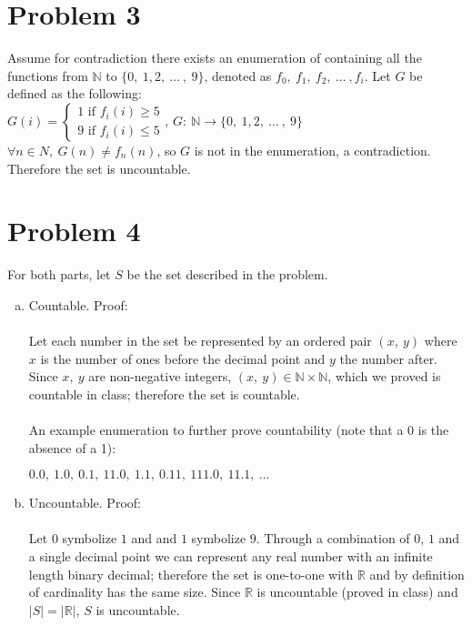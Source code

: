 \documentclass[11pt]{article}
\begin{document}
\section*{Problem 3}
	Assume for contradiction there exists an enumeration of containing all the functions from $\mathbb{N}$ to $\{0,\ 1,2,\ \ldots\ ,\ 9\}$, 
	denoted as $f_0,\ f_1,\ f_2,\ \ldots\ , f_i$. Let $G$ be defined as the following:\\
	
	
	$G(i) = \begin{cases}
		1 \text{ if } f_i(i) \geq 5 \\
		9 \text{ if } f_i(i) \le 5
	\end{cases}$, $G:\ \mathbb{N} \rightarrow \{0,\ 1,2,\ \ldots\ ,\ 9\}$
	\\[2ex]
	$\forall n \in N,\ G(n) \neq f_n(n)$, so $G$ is not in the enumeration, a contradiction. Therefore the set is uncountable.
	
	
\section*{Problem 4} For both parts, let $S$ be the set described in the problem.


\begin{enumerate}[(a)]
\item
	Countable. Proof:
	\\\\
	Let each number in the set be represented by an ordered pair $(x,\ y)$ where $x$ is the number of ones before the
	decimal point and $y$ the number after. Since $x,\ y$ are non-negative integers, $(x,\ y) \in \mathbb{N} \times
	\mathbb{N}$, which we proved is countable in class; therefore the set is countable. 
	\\\\
	An example enumeration to further prove countability (note that a 0 is the absence of a 1):
	
	$0.0,\ 1.0,\ 0.1,\ 11.0,\ 1.1,\ 0.11,\ 111.0,\ 11.1,\ \ldots$
	
\item
	Uncountable. Proof:
	\\\\
	Let $0$ symbolize $1$ and and $1$ symbolize $9$. Through a combination of $0$, $1$ and a single decimal point
	we can represent any real number with an infinite length binary decimal; therefore the set is one-to-one with $\mathbb{R}$ and by definition
	of cardinality has the same size. Since $\mathbb{R}$ is uncountable (proved in class) and $|S| =  |\mathbb{R}|$, 
	$S$ is uncountable.


\end{enumerate}
\end{document}
